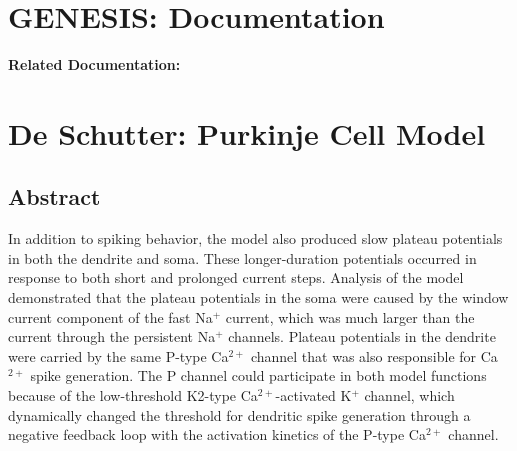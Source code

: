 \documentclass[12pt]{article}
\begin{document}
\section*{GENESIS: Documentation}

{\bf Related Documentation:}

\section*{De Schutter: Purkinje Cell Model}

\subsection*{Abstract}

In addition to spiking behavior, the model also produced
slow plateau potentials in both the dendrite and soma. These
longer-duration potentials occurred in response to both short and
prolonged current steps. Analysis of the model demonstrated that
the plateau potentials in the soma were caused by the window
current component of the fast Na$^+$ current, which was much
larger than the current through the persistent Na$^+$ channels.
Plateau potentials in the dendrite were carried by the same P-type
Ca$^{2+}$ channel that was also responsible for Ca$^{2+}$ spike generation.
The P channel could participate in both model functions because
of the low-threshold K2-type Ca$^{2+}$-activated K$^+$ channel, which
dynamically changed the threshold for dendritic spike generation
through a negative feedback loop with the activation kinetics of
the P-type Ca$^{2+}$ channel.
\end{document}
